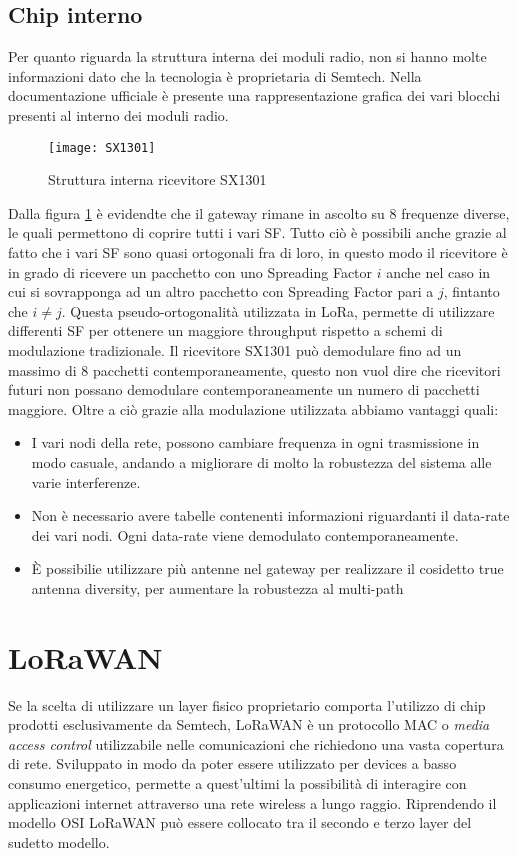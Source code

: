 \subsection{Chip interno}
Per quanto riguarda la struttura interna dei moduli radio, non si hanno molte
informazioni dato che la tecnologia è proprietaria di Semtech. Nella
documentazione ufficiale è presente una rappresentazione grafica dei vari
blocchi presenti al interno dei moduli radio.

\begin{figure}[h]
\centering 
\texttt{[image: SX1301]}
\caption{Struttura interna ricevitore SX1301}
\label{fig:sx1301}
\end{figure}

Dalla figura \ref{fig:sx1301} è evidendte che il gateway rimane in ascolto su 8 
frequenze diverse, le quali permettono di coprire tutti i vari SF. 
Tutto ciò è possibili anche grazie al fatto che i vari SF sono quasi ortogonali 
fra di loro, in questo modo il ricevitore è in grado di ricevere un pacchetto
con uno Spreading Factor $i$ anche nel caso in cui si sovrapponga ad un altro
pacchetto con Spreading Factor pari a $j$, fintanto che $i\neq j$. Questa
pseudo-ortogonalità utilizzata in LoRa, permette di utilizzare differenti SF per
ottenere un maggiore throughput rispetto a schemi di modulazione tradizionale.
Il ricevitore  SX1301 può demodulare fino ad un massimo di 8 pacchetti
contemporaneamente, questo non vuol dire che ricevitori futuri non possano
demodulare contemporaneamente un numero di pacchetti maggiore.
Oltre a ciò grazie alla modulazione utilizzata abbiamo vantaggi quali:
\begin{itemize}
\item I vari nodi della rete, possono cambiare frequenza in ogni trasmissione in
modo casuale, andando a migliorare di molto la robustezza del sistema alle varie
interferenze.
\item Non è necessario avere tabelle contenenti informazioni riguardanti il
data-rate dei vari nodi. Ogni data-rate viene demodulato contemporaneamente.
\item È possibilie utilizzare più antenne nel gateway per realizzare il
cosidetto true antenna diversity, per aumentare la robustezza al multi-path
\end{itemize}

\section{LoRaWAN}
Se la scelta di utilizzare un layer fisico proprietario comporta l'utilizzo di
chip prodotti esclusivamente da Semtech, 
LoRaWAN è un protocollo MAC o \emph{media access control} utilizzabile nelle
comunicazioni che richiedono una vasta copertura di rete. Sviluppato in modo da
poter essere utilizzato per devices a basso consumo energetico, permette a
quest'ultimi la possibilità di interagire con applicazioni internet attraverso
una rete wireless a lungo raggio.
Riprendendo il modello OSI LoRaWAN può essere collocato tra il secondo e terzo
layer del sudetto modello.

